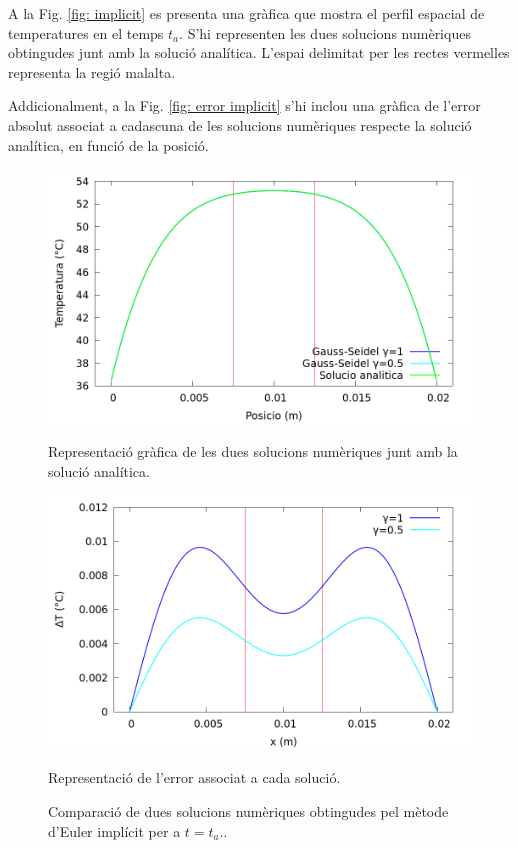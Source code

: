 \documentclass[11pt]{article}
\begin{document}
A la Fig. \ref{fig: implicit} es presenta una gràfica que mostra el perfil espacial de temperatures en el temps $t_a$. S'hi representen les dues solucions numèriques obtingudes junt amb la solució analítica. L'espai delimitat per les rectes vermelles representa la regió malalta.

Addicionalment, a la Fig. \ref{fig: error implicit} s'hi inclou una gràfica de l'error absolut associat a cadascuna de les solucions numèriques respecte la solució analítica, en funció de la posició. 

\begin{figure}[htbp]
    \centering
    \begin{minipage}{0.45\textwidth}
        \centering
        \includegraphics[width=\linewidth]{Implicit_N/implicit_grafica.png}
        \caption{Representació gràfica de les dues solucions numèriques junt amb la solució analítica.}
        \label{fig: implicit}
    \end{minipage}\hfill
    \begin{minipage}{0.45\textwidth}
        \centering
        \includegraphics[width=\linewidth]{Implicit_N/error_implicit.png}
        \caption{Representació de l'error associat a cada solució.}
        \label{fig: error implicit}
    \end{minipage}
    \caption{Comparació de dues solucions numèriques obtingudes pel mètode d'Euler implícit per a $t=t_a$..}
    \label{fig:overall}
\end{figure}
\end{document}
